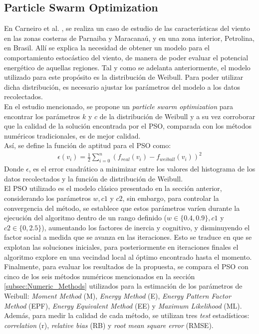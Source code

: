  \subsection{Particle Swarm Optimization}
 En Carneiro et al. \cite{Carneiro15}, se realiza un caso de estudio de las características del viento en las zonas costeras de Parnaiba y Maracanaú, y en una zona interior, Petrolina, en Brasil. Allí se explica la necesidad de obtener un modelo para el comportamiento estocástico del viento, de manera de poder evaluar el potencial energético de aquellas regiones. Tal y como se adelanta anteriormente, el modelo utilizado para este propósito es la distribución de Weibull. Para poder utilizar dicha distribución, es necesario ajustar los parámetros del modelo a los datos recolectados.\\
 En el estudio mencionado, se propone un \emph{particle swarm optimization} para encontrar los parámetros $k$ y $c$ de la distribución de Weibull y a su vez corroborar que la calidad de la solución encontrada por el PSO, comparada con los métodos numéricos tradicionales, es de mejor calidad.\\
 Así, se define la función de aptitud para el PSO como:
\begin{align}\label{eq:PSO_FO}
    \epsilon(v_i) = \frac{1}{2}\sum_{i=0}^{n}(f_{real}(v_i) - f_{weibull}(v_i))^2
\end{align}
Donde $\epsilon$, es el error cuadrático a minimizar entre los valores del histograma de los datos recolectados y la función de distribución de Weibull.\\
El PSO utilizado es el modelo clásico presentado en la sección anterior, considerando los parámetros $w, c1$ y $c2$, sin embargo, para controlar la convergencia del método, se establece que estos parámetros varíen durante la ejecución del algoritmo dentro de un rango definido ($w \in \{0.4, 0.9\}, c1$ y $c2 \in \{0, 2.5\}$), aumentando los factores de inercia y cognitivo, y disminuyendo el factor social a medida que se avanza en las iteraciones. Esto se traduce en que se explotan las soluciones iniciales, para posteriormente en iteraciones finales el algoritmo explore en una vecindad local al óptimo encontrado hasta el momento.\\
Finalmente, para evaluar los resultados de la propuesta, se compara el PSO con cinco de los seis métodos numéricos mencionados en la sección \ref{subsec:Numeric_Methods} utilizados para la estimación de los parámetros de Weibull: \emph{Moment Method} (M), \emph{Energy Method} (E), \emph{Energy Pattern Factor Method} (EPF), \emph{Energy Equivalent Method} (EE) y \emph{Maximum Likelihood} (ML). Además, para medir la calidad de cada método, se utilizan tres \emph{test} estadísticos: \emph{correlation} (r), \emph{relative bias} (RB) y \emph{root mean square error} (RMSE).\\
